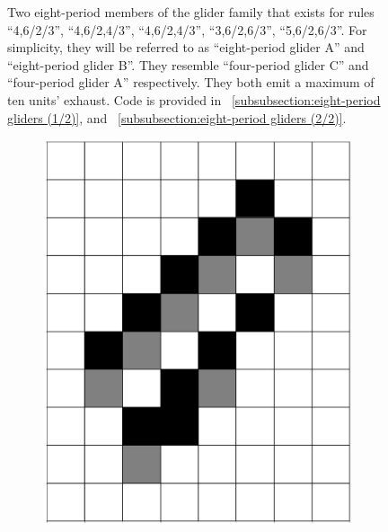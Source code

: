 \documentclass[12pt]{article}
\numberwithin{figure}{section} %
\begin{document}
\begin{figure}[H]
\begin{subfigure}{0.3\textwidth}
     \subcaption{}
   \end{subfigure}
   \setcounter{subfigure}{0}
   \caption[Eight-period gliders]{Two eight-period members of the glider family that exists for rules “4,6/2/3”, “4,6/2,4/3”, “4,6/2,4/3”, “3,6/2,6/3”, “5,6/2,6/3”. For simplicity, they will be referred to as “eight-period glider A” and “eight-period glider B”. They resemble “four-period glider C” and “four-period glider A” respectively. They both emit a maximum of ten units’ exhaust.  Code is provided in ~\ref{subsubsection:eight-period gliders (1/2)}, and ~\ref{subsubsection:eight-period gliders (2/2)}. }
   \label{fig:eight-period gliders}
   \vspace{-1.5em}
\end{figure}

\begin{figure}[H]
\centering
 \begin{subfigure}{0.2\textwidth}
     \centering
     \includegraphics[angle=270,width=\linewidth]{Section4/24.0}
     \subcaption{}
   \end{subfigure}

\end{figure}
\end{document}
